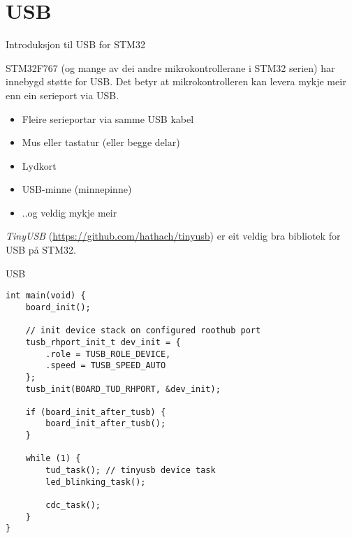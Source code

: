 \section{USB}

\begin{frame}{Introduksjon til USB for STM32}
	
	STM32F767 (og mange av dei andre mikrokontrollerane i STM32 serien) har innebygd støtte for USB. Det betyr at mikrokontrolleren kan levera mykje meir enn ein serieport via USB.
	
	\begin{itemize}
		\item Fleire serieportar via samme USB kabel
		\item Mus eller tastatur (eller begge delar)
		\item Lydkort
		\item USB-minne (minnepinne)
		\item ..og veldig mykje meir
	\end{itemize}
	
	\textit{TinyUSB} (\url{https://github.com/hathach/tinyusb}) er eit veldig bra bibliotek for USB på STM32.
	
\end{frame}




\begin{frame}[containsverbatim]{USB}
	
	\begin{verbatim}
int main(void) {
	board_init();
	
	// init device stack on configured roothub port
	tusb_rhport_init_t dev_init = {
		.role = TUSB_ROLE_DEVICE,
		.speed = TUSB_SPEED_AUTO
	};
	tusb_init(BOARD_TUD_RHPORT, &dev_init);
	
	if (board_init_after_tusb) {
		board_init_after_tusb();
	}
	
	while (1) {
		tud_task(); // tinyusb device task
		led_blinking_task();
		
		cdc_task();
	}
}
	\end{verbatim}
	
\end{frame}

